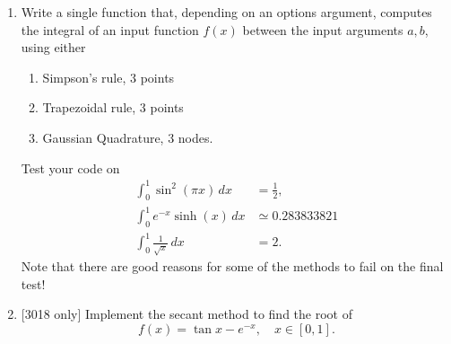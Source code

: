 \documentclass[10pt]{article}
\begin{document}
\begin{enumerate}
\item Write a single function that, depending on an options argument,
  computes the integral of an input function $f(x)$ between the input
  arguments $a, b$, using either
  \begin{enumerate}
  \item Simpson's rule, 3 points
  \item Trapezoidal rule, 3 points
  \item Gaussian Quadrature, 3 nodes.
  \end{enumerate}
  Test your code on
  \begin{align*}
    \int_0^1 \sin^2 (\pi x) \, dx & = \tfrac{1}{2}, \\
    \int_0^1 e^{-x} \sinh(x) \, dx & \simeq 0.283833821 \\
    \int_0^1 \frac{1}{\sqrt{x}} \, dx & = 2.
  \end{align*}
  Note that there are good reasons for some of the methods to fail on
  the final test!
\item {} [3018 only] Implement the secant method to find the root of
  \begin{equation*}
    f(x) = \tan x - e^{-x}, \quad x \in [0,1].
  \end{equation*}
\end{enumerate}
\end{document}

